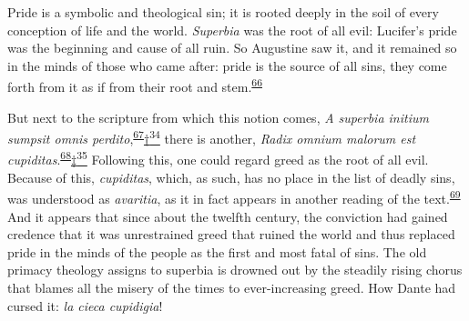 Pride is a symbolic and theological sin; it is rooted deeply in the soil
of every conception of life and the world. \emph{Superbia} was the root
of all evil: Lucifer's pride was the beginning and cause of all ruin. So
Augustine saw it, and it remained so in the minds of those who came
after: pride is the source of all sins, they come forth from it as if
from their root and
stem.\textsuperscript{\protect\hypertarget{08_Chapter_One__THE_PASSIONATE_INTE.xhtmlux5cux23id_2100}{\protect\hyperlink{23_NOTES.xhtmlux5cux23id_2101}{66}}}

But next to the scripture from which this notion comes, \emph{A superbia
initium sumpsit omnis
perdito},\textsuperscript{\protect\hypertarget{08_Chapter_One__THE_PASSIONATE_INTE.xhtmlux5cux23id_2098}{\protect\hyperlink{23_NOTES.xhtmlux5cux23id_2099}{67}}}\protect\hypertarget{08_Chapter_One__THE_PASSIONATE_INTE.xhtmlux5cux23id_2401}{\protect\hyperlink{23_NOTES.xhtmlux5cux23id_2402}{†\textsuperscript{34}}}
there is another, \emph{Radix omnium malorum est
cupiditas}.\textsuperscript{\protect\hypertarget{08_Chapter_One__THE_PASSIONATE_INTE.xhtmlux5cux23id_2096}{\protect\hyperlink{23_NOTES.xhtmlux5cux23id_2097}{68}}}\protect\hypertarget{08_Chapter_One__THE_PASSIONATE_INTE.xhtmlux5cux23id_2403}{\protect\hyperlink{23_NOTES.xhtmlux5cux23id_2404}{‡\textsuperscript{35}}}
Following this, one could regard greed as the root of all evil. Because
of this, \emph{cupiditas}, which, as such, has
\protect\hypertarget{08_Chapter_One__THE_PASSIONATE_INTE.xhtmlux5cux23page_26}{}{}no
place in the list of deadly sins, was understood as \emph{avaritia}, as
it in fact appears in another reading of the
text.\textsuperscript{\protect\hypertarget{08_Chapter_One__THE_PASSIONATE_INTE.xhtmlux5cux23id_2094}{\protect\hyperlink{23_NOTES.xhtmlux5cux23id_2095}{69}}}
And it appears that since about the twelfth century, the conviction had
gained credence that it was unrestrained greed that ruined the world and
thus replaced pride in the minds of the people as the first and most
fatal of sins. The old primacy theology assigns to superbia is drowned
out by the steadily rising chorus that blames all the misery of the
times to ever-increasing greed. How Dante had cursed it: \emph{la cieca
cupidigia}!

